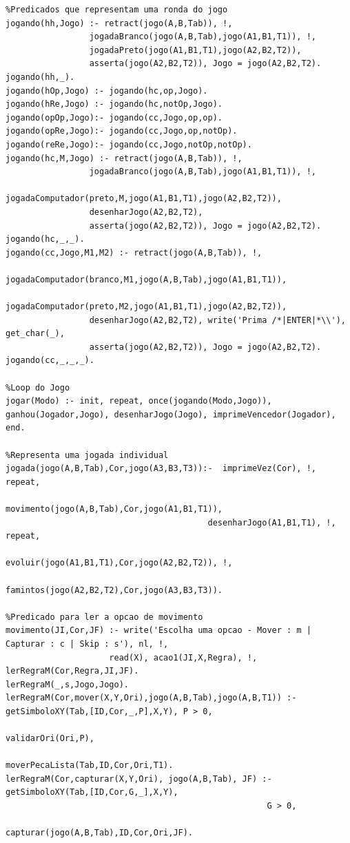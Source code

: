 \documentclass[a4paper]{article}
\begin{document}
\begin{lstlisting}
%Predicados que representam uma ronda do jogo
jogando(hh,Jogo) :- retract(jogo(A,B,Tab)), !,
                 jogadaBranco(jogo(A,B,Tab),jogo(A1,B1,T1)), !,
                 jogadaPreto(jogo(A1,B1,T1),jogo(A2,B2,T2)),
                 asserta(jogo(A2,B2,T2)), Jogo = jogo(A2,B2,T2).
jogando(hh,_).
jogando(hOp,Jogo) :- jogando(hc,op,Jogo).
jogando(hRe,Jogo) :- jogando(hc,notOp,Jogo).
jogando(opOp,Jogo):- jogando(cc,Jogo,op,op).
jogando(opRe,Jogo):- jogando(cc,Jogo,op,notOp).
jogando(reRe,Jogo):- jogando(cc,Jogo,notOp,notOp).
jogando(hc,M,Jogo) :- retract(jogo(A,B,Tab)), !,
                 jogadaBranco(jogo(A,B,Tab),jogo(A1,B1,T1)), !,
                 jogadaComputador(preto,M,jogo(A1,B1,T1),jogo(A2,B2,T2)),
                 desenharJogo(A2,B2,T2),
                 asserta(jogo(A2,B2,T2)), Jogo = jogo(A2,B2,T2).
jogando(hc,_,_).
jogando(cc,Jogo,M1,M2) :- retract(jogo(A,B,Tab)), !,
                 jogadaComputador(branco,M1,jogo(A,B,Tab),jogo(A1,B1,T1)),
                 jogadaComputador(preto,M2,jogo(A1,B1,T1),jogo(A2,B2,T2)),
                 desenharJogo(A2,B2,T2), write('Prima /*|ENTER|*\\'), get_char(_),
                 asserta(jogo(A2,B2,T2)), Jogo = jogo(A2,B2,T2).
jogando(cc,_,_,_).

%Loop do Jogo
jogar(Modo) :- init, repeat, once(jogando(Modo,Jogo)), ganhou(Jogador,Jogo), desenharJogo(Jogo), imprimeVencedor(Jogador), end.

%Representa uma jogada individual
jogada(jogo(A,B,Tab),Cor,jogo(A3,B3,T3)):-  imprimeVez(Cor), !, repeat,
                                         movimento(jogo(A,B,Tab),Cor,jogo(A1,B1,T1)),
                                         desenharJogo(A1,B1,T1), !, repeat,
                                         evoluir(jogo(A1,B1,T1),Cor,jogo(A2,B2,T2)), !,
                                         famintos(jogo(A2,B2,T2),Cor,jogo(A3,B3,T3)).

%Predicado para ler a opcao de movimento
movimento(JI,Cor,JF) :- write('Escolha uma opcao - Mover : m | Capturar : c | Skip : s'), nl, !,
                     read(X), acao1(JI,X,Regra), !, lerRegraM(Cor,Regra,JI,JF).
lerRegraM(_,s,Jogo,Jogo).
lerRegraM(Cor,mover(X,Y,Ori),jogo(A,B,Tab),jogo(A,B,T1)) :- getSimboloXY(Tab,[ID,Cor,_,P],X,Y), P > 0,
                                                         validarOri(Ori,P),
                                                         moverPecaLista(Tab,ID,Cor,Ori,T1).
lerRegraM(Cor,capturar(X,Y,Ori), jogo(A,B,Tab), JF) :-  getSimboloXY(Tab,[ID,Cor,G,_],X,Y),
                                                     G > 0,
                                                     capturar(jogo(A,B,Tab),ID,Cor,Ori,JF).


\end{lstlisting}
\end{document}
